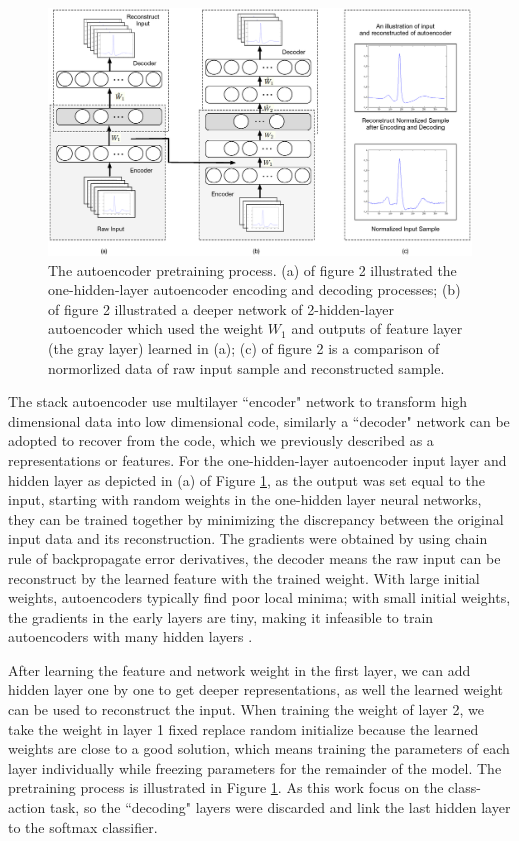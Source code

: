 \documentclass[journal]{IEEEtran}
\begin{document}
\begin{figure}[]
\centering
\includegraphics[width=6.5 in]{eps/Figure2.eps}
\caption{The autoencoder pretraining process. (a) of figure 2 illustrated the one-hidden-layer autoencoder encoding and decoding processes; (b) of figure 2 illustrated a deeper network of 2-hidden-layer autoencoder which used the weight $W_1$ and outputs of feature layer (the gray layer) learned in (a); (c) of figure 2 is a comparison of normorlized data of raw input sample and reconstructed sample.}
\label{figure2}
\end{figure}

The stack autoencoder use multilayer ``encoder" network to transform high dimensional data into low dimensional code, similarly a ``decoder" network can be adopted to recover from the code, which we previously described as a representations or features. For the one-hidden-layer autoencoder input layer and hidden layer as depicted in (a) of Figure \ref{figure2}, as the output was set equal to the input, starting with random weights in the one-hidden layer neural networks, they can be trained together by minimizing the discrepancy between the original input data and its reconstruction. The gradients were obtained by using chain rule of backpropagate error derivatives, the decoder means the raw input can be reconstruct by the learned feature with the trained weight.
With large initial weights, autoencoders typically find poor local minima; with small initial weights, the gradients in the early layers are tiny, making it infeasible to train autoencoders with many hidden layers \cite{hinton}. 

After learning the feature and network weight in the first layer, we can add hidden layer one by one to get deeper representations, as well the learned weight can be used to reconstruct the input. When training the weight of layer 2, we take the weight in layer 1 fixed replace random initialize because the learned weights are close to a good solution, which means training the parameters of each layer individually while freezing parameters for the remainder of the model. The pretraining process is illustrated in Figure \ref{figure2}. As this work focus on the class-action task, so the ``decoding" layers were discarded and link the last hidden layer to the softmax classifier. 
    
\end{document}
